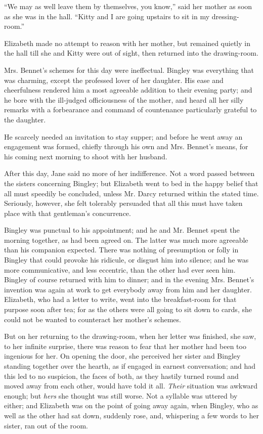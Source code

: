 ``We may as well leave them by themselves, you know,'' said her mother as soon as she was in the hall. ``Kitty and I are going upstairs to sit in my dressing-room.''

Elizabeth made no attempt to reason with her mother, but remained quietly in the hall till she and Kitty were out of sight, then returned into the drawing-room.

Mrs. Bennet's schemes for this day were ineffectual. Bingley was everything that was charming, except the professed lover of her daughter. His ease and cheerfulness rendered him a most agreeable addition to their evening party; and he bore with the ill-judged officiousness of the mother, and heard all her silly remarks with a forbearance and command of countenance particularly grateful to the daughter.

He scarcely needed an invitation to stay supper; and before he went away an engagement was formed, chiefly through his own and Mrs. Bennet's means, for his coming next morning to shoot with her husband.

After this day, Jane said no more of her indifference. Not a word passed between the sisters concerning Bingley; but Elizabeth went to bed in the happy belief that all must speedily be concluded, unless Mr. Darcy returned within the stated time. Seriously, however, she felt tolerably persuaded that all this must have taken place with that gentleman's concurrence.

Bingley was punctual to his appointment; and he and Mr. Bennet spent the morning together, as had been agreed on. The latter was much more agreeable than his companion expected. There was nothing of presumption or folly in Bingley that could provoke his ridicule, or disgust him into silence; and he was more communicative, and less eccentric, than the other had ever seen him. Bingley of course returned with him to dinner; and in the evening Mrs. Bennet's invention was again at work to get everybody away from him and her daughter. Elizabeth, who had a letter to write, went into the breakfast-room for that purpose soon after tea; for as the others were all going to sit down to cards, she could not be wanted to counteract her mother's schemes.

But on her returning to the drawing-room, when her letter was finished, she saw, to her infinite surprise, there was reason to fear that her mother had been too ingenious for her. On opening the door, she perceived her sister and Bingley standing together over the hearth, as if engaged in earnest conversation; and had this led to no suspicion, the faces of both, as they hastily turned round and moved away from each other, would have told it all. \textit{Their} situation was awkward enough; but \textit{hers} she thought was still worse. Not a syllable was uttered by either; and Elizabeth was on the point of going away again, when Bingley, who as well as the other had sat down, suddenly rose, and, whispering a few words to her sister, ran out of the room.

